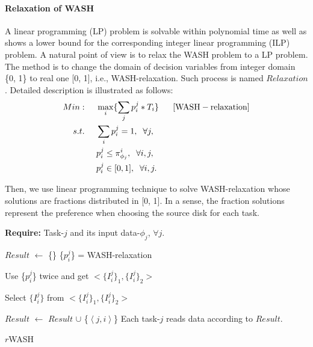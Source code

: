 \documentclass[conference]{IEEEtran}
\begin{document}
\paragraph{\textbf{Relaxation of WASH}} A linear programming (LP) problem is solvable within polynomial time as well as shows a lower bound for the corresponding integer linear programming (ILP) problem. A natural point of view is to relax the WASH problem to a LP problem. The method is to change the domain of decision variables from integer domain \{0, 1\} to real one [0, 1], i.e., WASH-relaxation. Such process is named $Relaxation$. Detailed description is illustrated as follows: 
\vspace{-0.2cm}
 \begin{align}
 Min:&\;\;\;\;\;\max\limits_{i}\{\sum_{j}p_i^j*T_i\}\;\;\;\;\;\;[\rm{WASH-relaxation}]\nonumber\\
 s.t. 
 &\;\;\;\;\;\sum_{i}p_i^j = 1,\;\;\forall j,\nonumber\\
 &\;\;\;\;\;p_i^j \leq \pi_{\phi_j}^{i},\;\;\forall i,j,\nonumber\\
 &\;\;\;\;\;p_i^j \in[0, 1],\;\;\forall i,j.\nonumber
 \end{align}

Then, we use linear programming technique to solve WASH-relaxation whose solutions are fractions distributed in [0, 1]. In a sense, the fraction solutions represent the preference when choosing the source disk for each task. 

 \begin{algorithm}[!t]
 	\textbf{Require:} Task-$j$ and its input data-$\phi_j$, $\forall j$. %
 	\begin{algorithmic}[1]	
 		\State $Result$ $\gets$ \{\}
 		\State \{$p_i^j$\} = WASH-relaxation		
 		
 		
 		\State Use \{$p_i^j$\} twice and get $<\{I_i^j\}_1, \{I_i^j\}_2 >$
 		
		\State Select $\{I_i^j\}$ from $<\{I_i^j\}_1, \{I_i^j\}_2>$


 			\State $Result$ $\gets$ $Result$ $\cup$ 	
 			\{$\left \langle j, i\right \rangle$\}
 			\EndIf
 		\EndFor	
 		\State Each task-$j$ reads data according to $Result$.
 	\end{algorithmic}
 	\caption{$r$WASH}\label{WASH-rdm}
 \end{algorithm}
\end{document}
